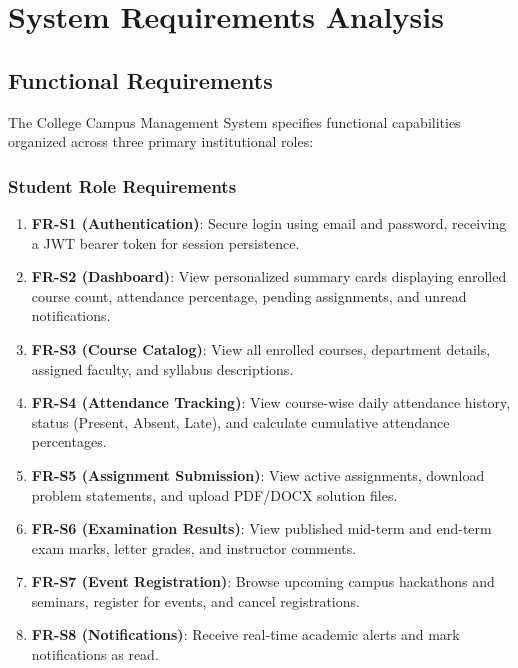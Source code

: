 \chapter{System Requirements Analysis}
\label{chap:system_requirements}

\section{Functional Requirements}
The College Campus Management System specifies functional capabilities organized across three primary institutional roles:

\subsection{Student Role Requirements}
\begin{enumerate}
    \item \textbf{FR-S1 (Authentication)}: Secure login using email and password, receiving a JWT bearer token for session persistence.
    \item \textbf{FR-S2 (Dashboard)}: View personalized summary cards displaying enrolled course count, attendance percentage, pending assignments, and unread notifications.
    \item \textbf{FR-S3 (Course Catalog)}: View all enrolled courses, department details, assigned faculty, and syllabus descriptions.
    \item \textbf{FR-S4 (Attendance Tracking)}: View course-wise daily attendance history, status (Present, Absent, Late), and calculate cumulative attendance percentages.
    \item \textbf{FR-S5 (Assignment Submission)}: View active assignments, download problem statements, and upload PDF/DOCX solution files.
    \item \textbf{FR-S6 (Examination Results)}: View published mid-term and end-term exam marks, letter grades, and instructor comments.
    \item \textbf{FR-S7 (Event Registration)}: Browse upcoming campus hackathons and seminars, register for events, and cancel registrations.
    \item \textbf{FR-S8 (Notifications)}: Receive real-time academic alerts and mark notifications as read.
\end{enumerate}

